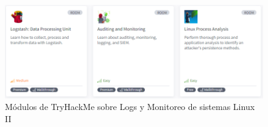 \begin{figure}[H]
    \centering
    \includegraphics[width=1\linewidth]{imagenes/logs-thm2.png}
    \caption{Módulos de TryHackMe sobre Logs y Monitoreo de sistemas Linux II}
    \label{fig:logs-thm}
\end{figure}
